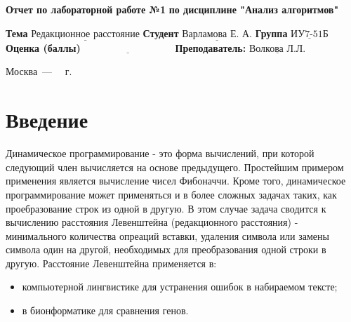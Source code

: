 \documentclass{report}
\begin{document}
\begin{titlepage}
	
	\begin{center}
		\noindent\begin{minipage}{1.3\textwidth}\centering
			\Large\textbf{  Отчет по лабораторной работе №1}\newline
			\textbf{по дисциплине "Анализ алгоритмов"}\newline\newline
		\end{minipage}
	\end{center}
	
	\noindent\textbf{Тема} $\underline{\text{Редакционное расстояние}}$\newline\newline
	\noindent\textbf{Студент} $\underline{\text{Варламова Е. А.}}$\newline\newline
	\noindent\textbf{Группа} $\underline{\text{ИУ7-51Б}}$\newline\newline
	\noindent\textbf{Оценка (баллы)} $\underline{\text{~~~~~~~~~~~~~~~~~~~~~~~~~~~}}$\newline\newline
	\noindent\textbf{Преподаватель: } $\underline{\text{Волкова Л.Л.}}$\newline\newline\newline
	
	\begin{center}
		\vfill
		Москва~---~\the\year
		~г.
	\end{center}
\end{titlepage}


\tableofcontents
  
\newpage
\chapter*{Введение}


Динамическое программирование - это форма вычислений, при которой следующий член вычисляется на основе предыдущего. Простейшим примером применения является вычисление чисел Фибоначчи. Кроме того, динамическое программирование может применяться и в более сложных задачах таких, как проебразование строк из одной в другую. В этом случае задача сводится к вычислению расстояния Левенштейна (редакционного расстояния) - минимального количества опреаций вставки, удаления символа или замены символа один на другой, необходимых для преобразования одной строки в другую. Расстояние Левенштейна применяется в:
\begin{itemize}
\item компьютерной лингвистике для устранения  ошибок в набираемом тексте;
\item в бионформатике для сравнения генов.
\end{itemize}
\end{document}
